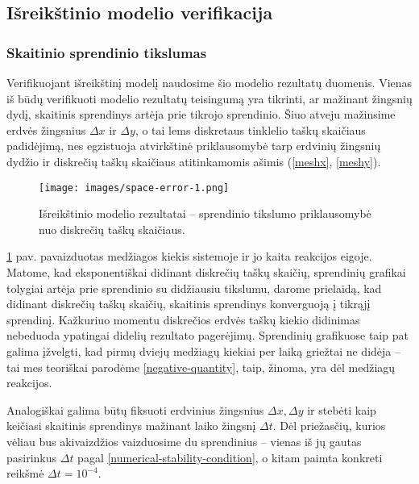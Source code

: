\subsection{Išreikštinio modelio verifikacija}

\subsubsection*{Skaitinio sprendinio tikslumas}

Verifikuojant išreikštinį modelį naudosime šio modelio rezultatų duomenis. Vienas iš būdų verifikuoti modelio rezultatų teisingumą yra tikrinti, ar mažinant žingsnių dydį, skaitinis sprendinys artėja prie tikrojo sprendinio. Šiuo atveju mažinsime erdvės žingsnius $\Delta x$ ir $\Delta y$, o tai lems diskretaus tinklelio taškų skaičiaus padidėjimą, nes egzistuoja atvirkštinė priklausomybė tarp erdvinių žingsnių dydžio ir diskrečių taškų skaičiaus atitinkamomis ašimis (\ref{meshx}, \ref{meshy}).

\newpage

\begin{figure}[h!]
    \centering
    \texttt{[image: images/space-error-1.png]}

    \caption{Išreikštinio modelio rezultatai -- sprendinio tikslumo priklausomybė nuo diskrečių taškų skaičiaus. }

    \label{results-space-error}
\end{figure}

\ref{results-space-error} pav. pavaizduotas medžiagos kiekis sistemoje ir jo kaita reakcijos eigoje. Matome, kad eksponentiškai didinant diskrečių taškų skaičių, sprendinių grafikai tolygiai artėja prie sprendinio su didžiausiu tikslumu, darome prielaidą, kad didinant diskrečių taškų skaičių, skaitinis sprendinys konverguoją į tikrąjį sprendinį. Kažkuriuo momentu diskrečios erdvės taškų kiekio didinimas nebeduoda ypatingai didelių rezultato pagerėjimų. Sprendinių grafikuose taip pat galima įžvelgti, kad pirmų dviejų medžiagų kiekiai per laiką griežtai ne didėja -- tai mes teoriškai parodėme \eqref{negative-quantity}, taip, žinoma, yra dėl  medžiagų reakcijos. 

Analogiškai galima būtų fiksuoti erdvinius žingsnius $\Delta x, \Delta y$ ir stebėti kaip keičiasi skaitinis sprendinys mažinant laiko žingsnį $\Delta t$. Dėl priežasčių, kurios vėliau bus akivaizdžios vaizduosime du sprendinius -- vienas iš jų gautas pasirinkus $\Delta t$ pagal \eqref{numerical-stability-condition}, o kitam paimta konkreti reikšmė $\Delta t = 10^{-4}$.

